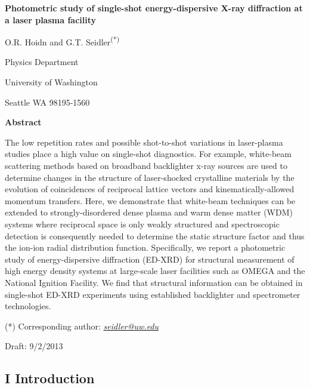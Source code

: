 \textbf{Photometric study of single-shot energy-dispersive X-ray
diffraction at a laser plasma facility}

O.R. Hoidn and G.T. Seidler\textsuperscript{(*)}

Physics Department

University of Washington

Seattle WA 98195-1560

\textbf{Abstract}

The low repetition rates and possible shot-to-shot variations in
laser-plasma studies place a high value on single-shot diagnostics. For
example, white-beam scattering methods based on broadband backlighter
x-ray sources are used to determine changes in the structure of
laser-shocked crystalline materials by the evolution of coincidences of
reciprocal lattice vectors and kinematically-allowed momentum transfers.
Here, we demonstrate that white-beam techniques can be extended to
strongly-disordered dense plasma and warm dense matter (WDM) systems
where reciprocal space is only weakly structured and spectroscopic
detection is consequently needed to determine the static structure
factor and thus the ion-ion radial distribution function. Specifically,
we report a photometric study of energy-dispersive diffraction (ED-XRD)
for structural measurement of high energy density systems at large-scale
laser facilities such as OMEGA and the National Ignition Facility. We
find that structural information can be obtained in single-shot ED-XRD
experiments using established backlighter and spectrometer technologies.

(*) Corresponding author:
\href{mailto:seidler@uw.edu}{\emph{seidler@uw.edu}}

Draft: 9/2/2013

\subsection{I Introduction}\label{i-introduction}


